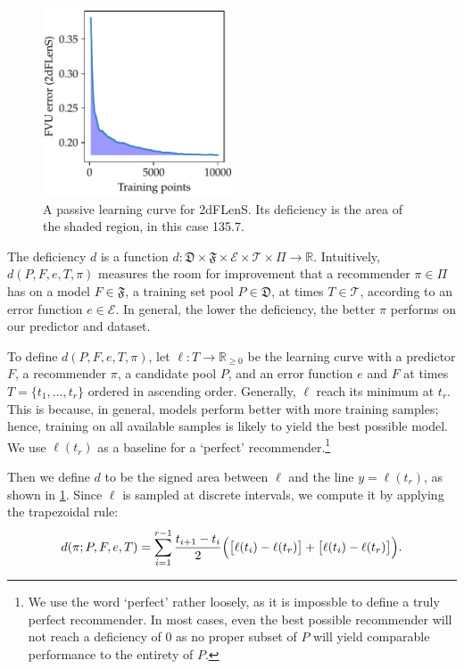 \documentclass[11pt,twoside,openright]{report}
\newcommand\bbR{\mathbb{R}}
\newcommand\cE{\mathcal{E}}
\newcommand\cT{\mathcal{T}}
\newcommand\fD{\mathfrak{D}}
\newcommand\fF{\mathfrak{F}}
\begin{document}
\begin{figure}
    \centering
    \includegraphics[width=0.5\textwidth]{deficiency_example.pdf}
    \caption{A passive learning curve for 2dFLenS. Its deficiency is the area of the shaded region, in this case 135.7.}
    \label{fig:deficiency_example}
  \end{figure}

The deficiency $d$ is a function $d : \fD \times \fF \times \cE \times \cT \times \Pi \to \bbR$. Intuitively, $d(P, F, e, T, \pi)$ measures the room for improvement that a recommender $\pi \in \Pi$ has on a model $F \in \fF$, a training set pool $P \in \fD$, at times $T \in \cT$, according to an error function $e \in \cE$. In general, the lower the deficiency, the better $\pi$ performs on our predictor and dataset.

To define $d(P, F, e, T, \pi)$, let $\ell : T \to \bbR_{\geq0}$ be the learning curve with a predictor $F$, a recommender $\pi$, a candidate pool $P$, and an error function $e$ and $F$ at times $T = \{t_1, \dots, t_r\}$ ordered in ascending order. Generally, $\ell$ reach its minimum at $t_r$. This is because, in general, models perform better with more training samples; hence, training on all available samples is likely to yield the best possible model. We use $\ell(t_r)$ as a baseline for a `perfect' recommender.\footnote{We use the word `perfect' rather loosely, as it is impossble to define a truly perfect recommender. In most cases, even the best possible recommender will not reach a deficiency of $0$ as no proper subset of $P$ will yield comparable performance to the entirety of $P$.}

Then we define $d$ to be the signed area between $\ell$ and the line $y = \ell(t_r)$, as shown in \cref{fig:deficiency_example}. Since $\ell$ is sampled at discrete intervals, we compute it by applying the trapezoidal rule: \[
  d(\pi; P, F, e, T) = \sum_{i=1}^{r-1} \frac{t_{i+1} - t_i}{2}\Big(\big[\ell(t_i) - \ell(t_r)\big] + \big[\ell(t_i) - \ell(t_r)\big]\Big) \text.
\]
\end{document}
